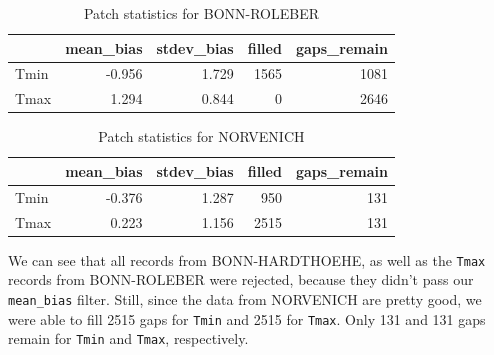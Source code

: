 \documentclass[
]{book}
\newenvironment{Shaded}{\begin{snugshade}}{\end{snugshade}}
\newcommand{\DataTypeTok}[1]{\textcolor[rgb]{0.13,0.29,0.53}{#1}}
\newcommand{\DecValTok}[1]{\textcolor[rgb]{0.00,0.00,0.81}{#1}}
\newcommand{\KeywordTok}[1]{\textcolor[rgb]{0.13,0.29,0.53}{\textbf{#1}}}
\newcommand{\NormalTok}[1]{#1}
\newcommand{\OperatorTok}[1]{\textcolor[rgb]{0.81,0.36,0.00}{\textbf{#1}}}
\newcommand{\StringTok}[1]{\textcolor[rgb]{0.31,0.60,0.02}{#1}}
\begin{document}
\begin{table}

\caption{\label{tab:unnamed-chunk-16}Patch statistics for BONN-ROLEBER}
\fontsize{10}{12}\selectfont
\begin{tabular}[t]{l|r|r|r|r}
\hline
  & mean\_bias & stdev\_bias & filled & gaps\_remain\\
\hline
Tmin & -0.956 & 1.729 & 1565 & 1081\\
\hline
Tmax & 1.294 & 0.844 & 0 & 2646\\
\hline
\end{tabular}
\end{table}

\begin{Shaded}
\end{Shaded}

\begin{table}

\caption{\label{tab:unnamed-chunk-17}Patch statistics for NORVENICH}
\fontsize{10}{12}\selectfont
\begin{tabular}[t]{l|r|r|r|r}
\hline
  & mean\_bias & stdev\_bias & filled & gaps\_remain\\
\hline
Tmin & -0.376 & 1.287 & 950 & 131\\
\hline
Tmax & 0.223 & 1.156 & 2515 & 131\\
\hline
\end{tabular}
\end{table}

We can see that all records from BONN-HARDTHOEHE, as well as the \texttt{Tmax} records from BONN-ROLEBER were rejected, because they didn't pass our \texttt{mean\_bias} filter. Still, since the data from NORVENICH are pretty good, we were able to fill 2515 gaps for \texttt{Tmin} and 2515 for \texttt{Tmax}. Only 131 and 131 gaps remain for \texttt{Tmin} and \texttt{Tmax}, respectively.
\end{document}
